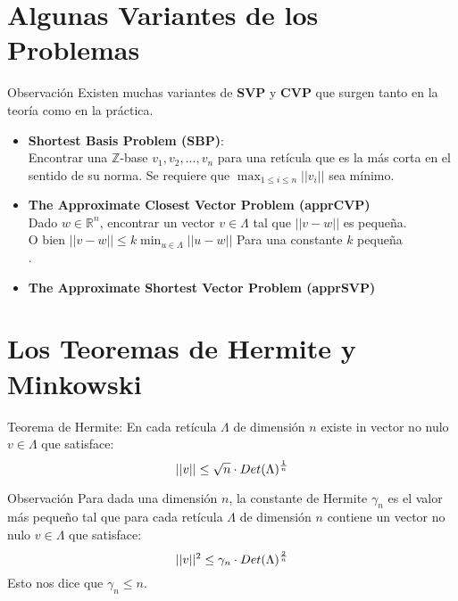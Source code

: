 \documentclass[12pt]{report}
\begin{document}
\section{Algunas Variantes de los Problemas}
\begin{block}{Observación}
Existen muchas variantes de \textbf{SVP} y \textbf{CVP} que surgen tanto en la teoría como en la práctica. 
    \end{block}

\begin{itemize}
\item  \textbf{Shortest Basis Problem (SBP)}:\\
Encontrar una $\mathbb{Z}$-base ${v}_{1}, {v}_{2}, ..., {v}_{n}$ para una retícula que es la más corta en el sentido de su norma. Se requiere que $\displaystyle\max_{1 \leq i \leq  n}||{v}_{i}||$ sea mínimo.
\item \textbf{The Approximate Closest Vector Problem (apprCVP)}\\
Dado $w\in\mathbb{R}^{n}$, encontrar un vector $v \in \Lambda$ tal que $||v-w||$ es pequeña.\\
O bien $||v -w ||\leq k \displaystyle\min_{u \in \Lambda}||u-w|| $  Para una constante $k$ pequeña \\.
\item \textbf{The Approximate Shortest Vector Problem (apprSVP)}
\end{itemize}
\pagebreak 

\section{Los Teoremas de Hermite y Minkowski}
\begin{alertblock}{Teorema de Hermite:}
En cada retícula $\Lambda$ de dimensión $n$ existe in vector no nulo $v \in \Lambda$ que satisface:
\begin{equation}
\centering
||v|| \leq \sqrt{n}\cdot Det(\Lambda)^{\frac{1}{n}}
\end{equation}
\end{alertblock}
    \begin{block}{Observación}
Para dada una dimensión $n$, la constante de Hermite $\gamma_{n}$ es el valor más pequeño tal que para cada retícula $\Lambda$ de dimensión $n$ contiene un vector no nulo $v\in\Lambda$ que satisface:
\begin{equation}
\centering
||v||^{2} \leq {\gamma}_{n}\cdot Det(\Lambda)^{\frac{2}{n}}
\end{equation}
Esto nos dice que $\gamma_{n} \leq n$.
\end{block}
\end{document}
